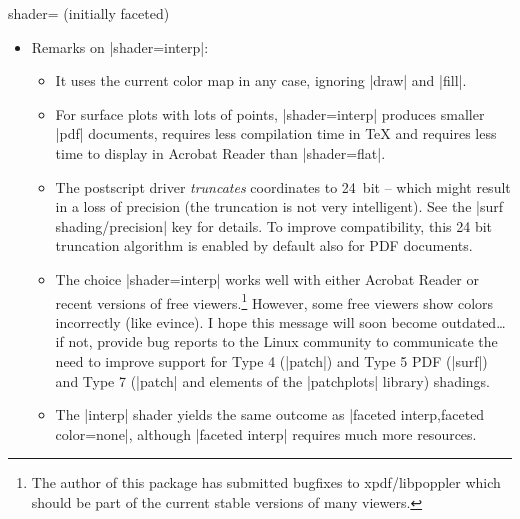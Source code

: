 {\begin{pgfplotskey}{shader= (initially faceted)%
}
\begin{itemize}
            But: Markers and surfaces do not share the same depth
            information. They are drawn on top of each other.
        \item Remarks on |shader=interp|:
            \begin{itemize}
                \item It uses the current color map in any case, ignoring
                    |draw| and |fill|.
                \item For surface plots with lots of points,
                    |shader=interp| produces smaller |pdf| documents,
                    requires less compilation time in \TeX{} and requires
                    less time to display in Acrobat Reader than
                    |shader=flat|.
                \item The postscript driver \emph{truncates} coordinates to
                    24~bit -- which might result in a loss of precision
                    (the truncation is not very intelligent). See the
                    |surf shading/precision| key for details. To improve
                    compatibility, this 24 bit truncation algorithm is enabled
                    by default also for PDF documents.
                \item The choice |shader=interp| works well with either
                    Acrobat Reader or recent versions of free
                    viewers.\footnote{The author of this package has
                    submitted bugfixes to xpdf/libpoppler which should be
                    part of the current stable versions of many viewers.}
                    However, some free viewers show colors incorrectly
                    (like evince). I hope this message will soon become
                    outdated\ldots{} if not, provide bug reports to the
                    Linux community to communicate the need to improve
                    support for Type 4 (|patch|) and Type 5 PDF (|surf|)
                    and Type 7 (|patch| and elements of the |patchplots|
                    library) shadings.
                \item The |interp| shader yields the same outcome as
                    |faceted interp,faceted color=none|, although
                    |faceted interp| requires much more resources.
            \end{itemize}
    \end{itemize}

\pgfplotsexpensiveexample
\begin{codeexample}[]
\end{codeexample}


\end{pgfplotskey}}
